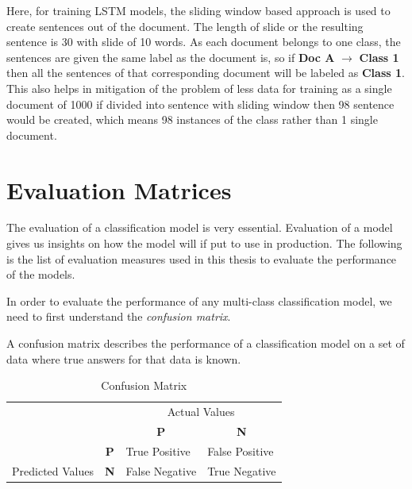 Here, for training LSTM models, the sliding window based approach is used to create sentences out of the document. The length of slide or the resulting sentence is 30 with slide of 10 words. As each document belongs to one class, the sentences are given the same label as the document is, so if  \textbf{Doc A} $\rightarrow$  \textbf{Class 1} then all the sentences of that corresponding document will be labeled as \textbf{Class 1}. This also helps in mitigation of the problem of less data for training as a single document of 1000 if divided into sentence with sliding window then 98 sentence would be created, which means 98 instances of the class rather than 1 single document. 


\section{Evaluation Matrices}\label{backgroundEvaluationMatrices}

The evaluation of a classification model is very essential. Evaluation of a model gives us insights on how the model will if put to use in production. The following is the list of evaluation measures used in this thesis to evaluate the performance of the models. 

In order to evaluate the performance of any multi-class classification model, we need to first understand the \textit{confusion matrix}.

A confusion matrix describes the performance of a classification model on a set of data where true answers for that data is known.


\begin{table}[!ht]
\centering
\begin{tabular}{ll|l|l|}
\cline{3-4}
 &  & \multicolumn{2}{c|}{Actual Values} \\ \cline{3-4} 
 &  & \multicolumn{1}{c|}{\textbf{P}} & \multicolumn{1}{c|}{\textbf{N}} \\ \hline
\multicolumn{1}{|l|}{} & \multicolumn{1}{c|}{\textbf{P}} & True Positive & False Positive \\ \cline{2-4} 
\multicolumn{1}{|l|}{\multirow{-2}{*}{Predicted Values}} & \textbf{N} & False Negative & True Negative \\ \hline
\end{tabular}
\caption{Confusion Matrix}
\label{table:confMatrix}
\end{table}

